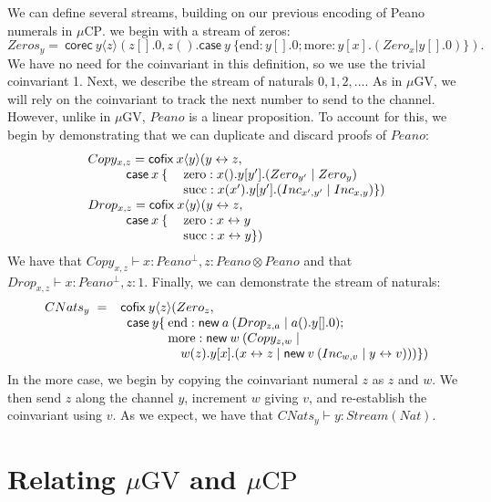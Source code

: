 \documentclass[orivec,envcountsame]{llncs}
\newcommand{\cpdual}[1]{#1^\perp}
\newcommand{\cptyp}[2]{#1 \vdash #2}
\newcommand{\mkwd}[1]{\mathsf{#1}}
\newcommand{\link}[2]{#1 \leftrightarrow #2}
\newcommand{\cut}[4]{\mkwd{new}\:#1 \: (#3 \mid #4)}
\newcommand{\corec}[5]{\mkwd{corec}\:#1 \langle #2 \rangle (#4,#5)}
\newcommand{\clabel}[1]{\mathrm{#1}}
\renewcommand{\case}[2]{\mkwd{case}\:#1\:\{#2\}}
\newcommand{\lrkwd}{\mkwd{cofix}}
\newcommand{\mucp}{$\mu\mathrm{CP}$\xspace}
\newcommand{\mugv}{$\mu\mathrm{GV}$\xspace}
\newcommand{\mcl}[2]{\multicolumn{#1}{l}{#2}}
\begin{document}
We can define several streams, building on our previous encoding of Peano numerals in \mucp.  we
begin with a stream of zeros:
\[
  Zeros_y =\ \corec{y}{z}{1}{z[].0}{z().\case{y}{\clabel{end}: y[].0; \clabel{more}: y[x].(Zero_x | y[].0)}}.
\]
We have no need for the coinvariant in this definition, so we use the trivial coinvariant 1.  Next,
we describe the stream of naturals $0,1,2,\dots$.  As in \mugv, we will rely on the coinvariant to
track the next number to send to the channel.  However, unlike in \mugv, $Peano$ is a linear
proposition.  To account for this, we begin by demonstrating that we can duplicate and discard
proofs of $Peano$:
\[\begin{array}{lll}
  \multicolumn{3}{l}{Copy_{x,z} = \lrkwd\:x\langle y \rangle ( \link{y}{z},} \\
  \quad \quad & \mkwd{case}\:x\:\{\:&\clabel{zero}: x().y[y'].(Zero_{y'} \mid Zero_{y}) \\
  & & \clabel{succ}: x(x').y[y'].(Inc_{x',y'} \mid Inc_{x,y}) \}) \\
  \multicolumn{3}{l}{Drop_{x,z} = \lrkwd\:x \langle y \rangle (\link{y}{z},} \\
  \quad \quad & \mkwd{case}\:x\:\{\:&\clabel{zero}: \link{x}{y} \\
  & & \clabel{succ}: \link{x}{y} \})
\end{array}\]
We have that $\cptyp{Copy_{x,z}}{x:\cpdual{Peano}, z:Peano \otimes Peano}$ and that
$\cptyp{Drop_{x,z}}{x:\cpdual{Peano},z:1}$. Finally, we can demonstrate the stream of naturals:
\[\begin{array}{r@{\hspace{2mm}}c@{\hspace{2mm}}l@{\hspace{0mm}}l@{\:}l}
  CNats_y & = & \mcl{3}{\lrkwd \: y \langle z \rangle (Zero_z,} \\
  & & \quad & \mkwd{case}\:y \{ & \clabel{end}: \cut{a}{}{Drop_{z,a}}{a().y[].0}; \\
  & & & & \clabel{more}: \mkwd{new}\:w\:(Copy_{z,w} \mid \\
  & & & & \quad w(z).y[x].(\link{x}{z} \mid \cut{v}{}{Inc_{w,v}}{\link{y}{v}}))\})
\end{array}\]
In the $\clabel{more}$ case, we begin by copying the coinvariant numeral $z$ as $z$ and $w$.  We
then send $z$ along the channel $y$, increment $w$ giving $v$, and re-establish the coinvariant
using $v$.  As we expect, we have that $\cptyp{CNats_y}{y:Stream(Nat)}$.

\section{Relating \mugv and \mucp}\label{sec:translation}
\end{document}
